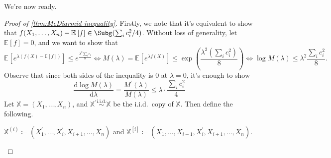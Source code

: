 We're now ready.

\begin{proof}[Proof of \autoref{thm:McDiarmid-inequality}]
  Firstly, we note that it's equivalent to show that \(f(X_1, \dots , X_n) - \mathbb{E}_{}\left[f \right] \in \Subg(\sum_{i} c_i^2 / 4) \). Without loss of generality, let \(\mathbb{E}_{}\left[f \right] = 0\), and we want to show that
  \[
    \mathbb{E}_{}\left[e^{\lambda (f(X) - \mathbb{E}_{}\left[f \right] )} \right] \leq e^{\frac{\lambda ^2 \sum_{i} c_i}{8}}
    \iff  M(\lambda ) = \mathbb{E}_{}\left[e^{\lambda f(X)} \right] \leq \exp \left( \frac{\lambda ^2 \left( \sum_{i} c_i^2 \right) }{8} \right)
    \iff  \log M(\lambda ) \leq \lambda ^2 \frac{\sum_{i} c_i^2}{8}.
  \]
  Observe that since both sides of the inequality is \(0\) at \(\lambda = 0\), it's enough to show
  \[
    \frac{\mathrm{d}\log M(\lambda )}{\mathrm{d}\lambda } = \frac{M^{\prime} (\lambda )}{M(\lambda )} \leq \lambda \cdot \frac{\sum_{i} c_i^2}{4}
  \]
  Let \(\mathbb{X} = (X_1, \dots , X_n)\), and \(\mathbb{X}^{\prime} \overset{\text{i.i.d.} }{\sim } \mathbb{X}\) be the i.i.d.\ copy of \(\mathbb{X}\). Then define the following.

  \begin{notation}\label{not:lec5}
    \(\mathbb{X}^{(i)} \coloneqq (X_1^{\prime} , \dots , X_i^{\prime} , X_{i+1}, \dots , X_n)\) and \(\mathbb{X}^{[i]} \coloneqq (X_1, \dots , X_{i-1}, X_i^{\prime} , X_{i+1}, \dots , X_n)\).
  \end{notation}


\end{proof}
